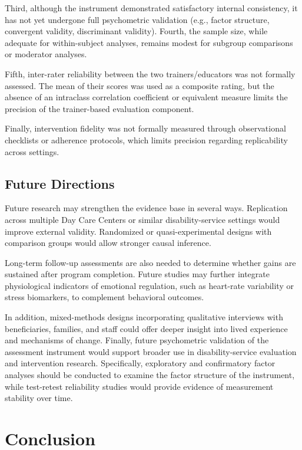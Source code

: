\documentclass[12pt,a4paper]{article}
\begin{document}
Third, although the instrument demonstrated satisfactory internal consistency, it has not yet undergone full psychometric validation (e.g., factor structure, convergent validity, discriminant validity). Fourth, the sample size, while adequate for within-subject analyses, remains modest for subgroup comparisons or moderator analyses.

Fifth, inter-rater reliability between the two trainers/educators was not formally assessed. The mean of their scores was used as a composite rating, but the absence of an intraclass correlation coefficient or equivalent measure limits the precision of the trainer-based evaluation component.

Finally, intervention fidelity was not formally measured through observational checklists or adherence protocols, which limits precision regarding replicability across settings.

\subsection{Future Directions}

Future research may strengthen the evidence base in several ways. Replication across multiple Day Care Centers or similar disability-service settings would improve external validity. Randomized or quasi-experimental designs with comparison groups would allow stronger causal inference.

Long-term follow-up assessments are also needed to determine whether gains are sustained after program completion. Future studies may further integrate physiological indicators of emotional regulation, such as heart-rate variability or stress biomarkers, to complement behavioral outcomes.

In addition, mixed-methods designs incorporating qualitative interviews with beneficiaries, families, and staff could offer deeper insight into lived experience and mechanisms of change. Finally, future psychometric validation of the assessment instrument would support broader use in disability-service evaluation and intervention research. Specifically, exploratory and confirmatory factor analyses should be conducted to examine the factor structure of the instrument, while test-retest reliability studies would provide evidence of measurement stability over time.


\section{Conclusion}
\end{document}

